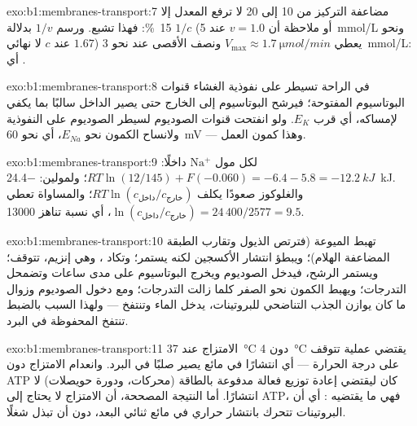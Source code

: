 \begin{solution}{exo:b1:membranes-transport:7}
مضاعفة التركيز من 10 إلى 20 لا ترفع المعدل إلا \qty{15}{\%}: فهذا
تشبع. ورسم $1/v$ بدلالة $1/c$ (أو ملاحظة أن $v = 1.0$ عند
\qty{5}{mmol/L} ونحو $1.67$ عند $c$ لا نهائي) يعطي
$V_{\max} \approx \qty{1.7}{\micro mol/min}$ ونصف الأقصى عند نحو
\qty{3}{mmol/L}: أي  .
\end{solution}

\begin{solution}{exo:b1:membranes-transport:8}
في الراحة تسيطر على نفوذية الغشاء قنوات البوتاسيوم المفتوحة؛ فيرشح
البوتاسيوم إلى الخارج حتى يصير الداخل سالبًا بما يكفي لإمساكه، أي قرب
$E_K$. ولو انفتحت قنوات الصوديوم لسيطر الصوديوم على النفوذية ولانساح
الكمون نحو $E_{Na}$، أي نحو \qty{+60}{mV} --- وهذا كمون العمل.
\end{solution}

\begin{solution}{exo:b1:membranes-transport:9}
لكل مول $\mathrm{Na^+}$ داخلًا: $RT\ln(12/145) + F(-0.060) = -6.4 - 5.8
= \qty{-12.2}{kJ}$؛ ولمولين: \qty{-24.4}{kJ}. والغلوكوز صعودًا يكلف
$RT\ln(c_{\text{داخل}}/c_{\text{خارج}})$؛ والمساواة تعطي
$\ln(c_{\text{داخل}}/c_{\text{خارج}}) = 24\,400/2577 = 9.5$، أي نسبة
تناهز \num{13000}.
\end{solution}

\begin{solution}{exo:b1:membranes-transport:10}
تهبط الميوعة (فترتص الذيول وتقارب الطبقة المضاعفة الهلام)؛ ويبطؤ
انتشار الأكسجين لكنه يستمر؛ وتكاد ، وهي إنزيم، تتوقف؛ ويستمر
الرشح، فيدخل الصوديوم ويخرج البوتاسيوم على مدى ساعات وتضمحل
التدرجات؛ ويهبط الكمون نحو الصفر كلما زالت التدرجات؛ ومع دخول
الصوديوم وزوال ما كان يوازن الجذب التناضحي للبروتينات، يدخل الماء
وتنتفخ  --- ولهذا السبب بالضبط تنتفخ   المحفوظة
في البرد.
\end{solution}

\begin{solution}{exo:b1:membranes-transport:11}
الامتزاج عند \qty{37}{\celsius} دون \qty{4}{\celsius} يقتضي عملية
تتوقف على درجة الحرارة --- أي انتشارًا في مائع يصير صلبًا في البرد.
وانعدام الامتزاج دون ATP كان ليقتضي إعادة توزيع فعالة مدفوعة بالطاقة
(محركات، ودورة حويصلات) لا انتشارًا. أما النتيجة المصححة، أن
الامتزاج لا يحتاج إلى ATP، فهي ما يقتضيه :
أي أن البروتينات تتحرك بانتشار حراري في مائع ثنائي البعد، دون أن
تبذل  شغلًا.
\end{solution}

